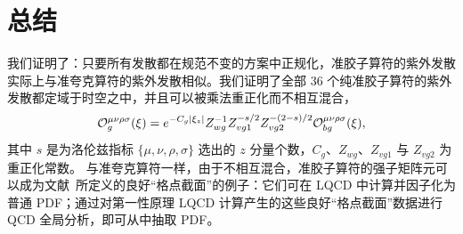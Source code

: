 \section{总结}
我们证明了：只要所有发散都在规范不变的方案中正规化，准胶子算符的紫外发散实际上与准夸克算符的紫外发散相似。我们证明了全部 36 个纯准胶子算符的紫外发散都定域于时空之中，并且可以被乘法重正化而不相互混合，
\begin{align}
{\cal O}_{g}^{\mu \nu \rho\sigma}(\xi)=e^{-C_g |\xi_z|}Z_{wg}^{-1}Z_{vg1}^{-s/2}Z_{vg2}^{-(2-s)/2}{\cal O}_{bg}^{\mu \nu \rho\sigma}(\xi),
\end{align}
其中 $s$ 是为洛伦兹指标 $\{ \mu,\nu,\rho,\sigma\}$ 选出的 $z$ 分量个数，$C_g$、$Z_{wg}$、$Z_{vg1}$ 与 $Z_{vg2}$ 为重正化常数。
与准夸克算符一样，由于不相互混合，准胶子算符的强子矩阵元可以成为文献~\cite{Ma:2014jla,Ma:2017pxb}所定义的良好“格点截面”的例子：它们可在 LQCD 中计算并因子化为普通 PDF；通过对第一性原理 LQCD 计算产生的这些良好“格点截面”数据进行 QCD 全局分析，即可从中抽取 PDF。
